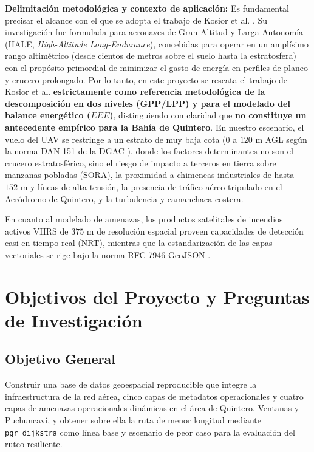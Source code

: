 \documentclass[letterpaper,12pt]{article}
\begin{document}
\noindent \textbf{Delimitación metodológica y contexto de aplicación:} Es fundamental precisar el alcance con el que se adopta el trabajo de Kosior et al. \cite{kosior}. Su investigación fue formulada para aeronaves de Gran Altitud y Larga Autonomía (HALE, \textit{High-Altitude Long-Endurance}), concebidas para operar en un amplísimo rango altimétrico (desde cientos de metros sobre el suelo hasta la estratosfera) con el propósito primordial de minimizar el gasto de energía en perfiles de planeo y crucero prolongado. Por lo tanto, en este proyecto se rescata el trabajo de Kosior et al. \textbf{estrictamente como referencia metodológica de la descomposición en dos niveles (GPP/LPP) y para el modelado del balance energético ($EEE$)}, distinguiendo con claridad que \textbf{no constituye un antecedente empírico para la Bahía de Quintero}. En nuestro escenario, el vuelo del UAV se restringe a un estrato de muy baja cota ($0$ a $120\text{ m}$ AGL según la norma DAN 151 de la DGAC \cite{dan151}), donde los factores determinantes no son el crucero estratosférico, sino el riesgo de impacto a terceros en tierra sobre manzanas pobladas (SORA), la proximidad a chimeneas industriales de hasta $152\text{ m}$ y líneas de alta tensión, la presencia de tráfico aéreo tripulado en el Aeródromo de Quintero, y la turbulencia y camanchaca costera.

En cuanto al modelado de amenazas, los productos satelitales de incendios activos VIIRS de $375\text{ m}$ de resolución espacial \cite{schroeder} proveen capacidades de detección casi en tiempo real (NRT), mientras que la estandarización de las capas vectoriales se rige bajo la norma RFC 7946 GeoJSON \cite{rfc7946}.

\section{Objetivos del Proyecto y Preguntas de Investigación}
\label{sec:objetivos}

\subsection{Objetivo General}

Construir una base de datos geoespacial reproducible que integre la infraestructura de la red aérea, cinco capas de metadatos operacionales y cuatro capas de amenazas operacionales dinámicas en el área de Quintero, Ventanas y Puchuncaví, y obtener sobre ella la ruta de menor longitud mediante \texttt{pgr\_dijkstra} como línea base y escenario de peor caso para la evaluación del ruteo resiliente.
\end{document}
